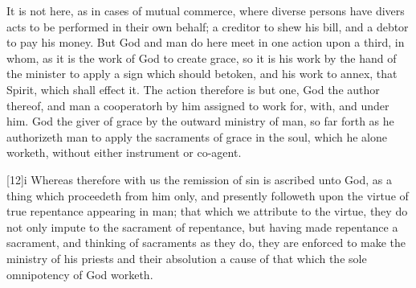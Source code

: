 It is not here, as in cases of mutual commerce, where diverse persons have divers acts to be performed in their own behalf; a creditor to shew his bill, and a debtor to pay his money. But God and man do here meet in one action upon a third, in whom, as it is the work of God to create grace, so it is his work by the hand of the minister to apply a sign which should betoken, and his work to annex, that Spirit, which shall effect it. The action therefore is but one, God the author thereof, and man a cooperatorh by him assigned to work for, with, and under him. God the giver of grace by the outward ministry of man, so far forth as he authorizeth man to apply the sacraments of grace in the soul, which he alone worketh, without either instrument or co-agent.

[12]i Whereas therefore with us the remission of sin is ascribed unto God, as a thing which proceedeth from him only, and presently followeth upon the virtue of true repentance appearing in man; that which we attribute to the virtue,  they do not only impute to the sacrament of repentance, but having made repentance a sacrament, and thinking of sacraments as they do, they are enforced to make the ministry of his priests and their absolution a cause of that which the sole omnipotency of God worketh.

